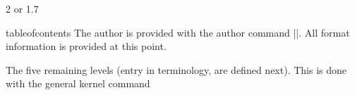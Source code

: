 \begin{teX}
\newcommand\@tocrmarg{2.55em}%
\newcommand\@dotsep{4.5}%
2 or 1.7
\end{teX}

\begin{docCommand}{tableofcontents}{}
 The author is provided with the author command |\tableofcontents|. All format information is provided at this point.
\end{docCommand}

\begin{teX}
\setcounter{tocdepth}{2}
\newcommand\tableofcontents{%
    \if@twocolumn
      \@restonecoltrue\onecolumn
    \else
      \@restonecolfalse
    \fi
    \chapter*{\contentsname
        \@mkboth{%
           \MakeUppercase\contentsname}{\MakeUppercase\contentsname}}%
    \@starttoc{toc}%
    \if@restonecol\twocolumn\fi
    }
\end{teX}

\begin{teX}
\newcommand*\l@part[2]{%
  \ifnum \c@tocdepth >-2\relax
    \addpenalty{-\@highpenalty}%
    \addvspace{2.25em \@plus\p@}%
    \setlength\@tempdima{3em}%
    \begingroup
      \parindent \z@ \rightskip \@pnumwidth
      \parfillskip -\@pnumwidth
      {\leavevmode
       \large \bfseries #1\hfil \hb@xt@\@pnumwidth{\hss #2}}\par
       \nobreak
         \global\@nobreaktrue
         \everypar{\global\@nobreakfalse\everypar{}}%
    \endgroup
  \fi}

\newcommand*\l@chapter[2]{%
  \ifnum \c@tocdepth >\m@ne
    \addpenalty{-\@highpenalty}%
    \vskip 1.0em \@plus\p@
    \setlength\@tempdima{1.5em}%
    \begingroup
      \parindent \z@ \rightskip \@pnumwidth
      \parfillskip -\@pnumwidth
      \leavevmode \bfseries
      \advance\leftskip\@tempdima
      \hskip -\leftskip
      #1\nobreak\hfil \nobreak\hb@xt@\@pnumwidth{\hss #2}\par
      \penalty\@highpenalty
    \endgroup
  \fi}
\end{teX}


The five remaining levels (entry in \latex terminology, are defined next). This is done with the general \latex kernel command 

